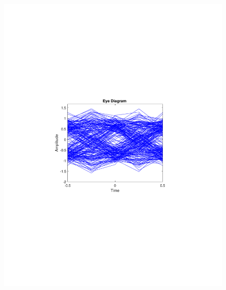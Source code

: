 \begin{refsection}
\begin{figure}[H]
\begin{minipage}{0.30\textwidth}
		\includegraphics[clip, trim=4cm 8cm 4cm 8cm, width=1\textwidth]{./sdf/m_qam_system/figures/expResults/homodyne/5_eye_4GBdInSig13dB_AfMIMO2.pdf}
		\label{fig:4GBdSpecMIMO2}
	\end{minipage}
	\begin{minipage}{0.30\textwidth}
		\centering

\end{minipage}
\end{figure}
\end{refsection}
